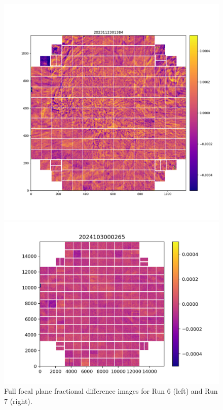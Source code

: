 \begin{figure}[htbp]
\centering
\begin{minipage}{0.45\textwidth}
    \centering
    \includegraphics[width=\linewidth]{figures/Run6_Weather.png}
\end{minipage}
\begin{minipage}{0.5\textwidth}
    \centering
    \includegraphics[width=\linewidth]{figures/Run7_WeatherDiffuser.png}
\end{minipage}    
    \caption{Full focal plane fractional difference images for Run 6 (left) and Run 7 (right).}

\label{fig:weather}
\end{figure}

